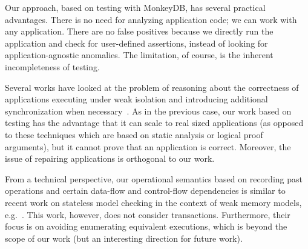 Our approach, based on testing with MonkeyDB, has several practical advantages.
There is no need for analyzing application code; we can work with any
application. There are no false positives because we directly run the
application and check for user-defined assertions, instead of looking for
application-agnostic anomalies. The limitation, of course, is
the inherent incompleteness of testing.

Several works have looked at the problem of reasoning about the correctness of
applications executing under weak isolation and introducing additional
synchronization when
necessary~\cite{DBLP:conf/eurosys/BalegasDFRPNS15,DBLP:conf/popl/GotsmanYFNS16,DBLP:conf/esop/NairP020,DBLP:conf/usenix/0001LCPRV14}.
As in the previous case, our work based on testing has the advantage that it can
scale to real sized applications (as opposed to these techniques which are based
on static analysis or logical proof arguments), but it cannot prove that an
application is correct. Moreover, the issue of repairing applications is
orthogonal to our work. 

From a technical perspective, our operational semantics based on recording past
operations and certain data-flow and control-flow dependencies is similar to
recent work on stateless model checking in the context of weak memory
models,
e.g.~\cite{DBLP:journals/pacmpl/Kokologiannakis18,DBLP:conf/tacas/AbdullaAAJLS15}.
This work, however, does not consider transactions. Furthermore, their focus is on
avoiding enumerating equivalent executions, which is beyond the scope of our
work (but an interesting direction for future work).

%




